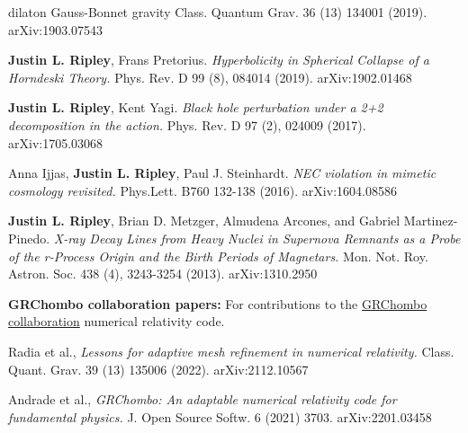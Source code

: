 \documentclass{my_cv}
\begin{document}
\begin{etaremune}
{      dilaton Gauss-Bonnet gravity}
   Class. Quantum Grav. 36 (13) 134001 (2019).
   arXiv:1903.07543
\item {\bf Justin L. Ripley}, Frans Pretorius. 
   \emph{Hyperbolicity in Spherical Collapse of a Horndeski Theory.}
   Phys. Rev. D 99 (8), 084014 (2019).
   arXiv:1902.01468
\item {\bf Justin L. Ripley}, Kent Yagi. 
   \emph{Black hole perturbation under a 2+2 decomposition
      in the action.}
   Phys. Rev. D 97 (2), 024009 (2017).
   arXiv:1705.03068
\item Anna Ijjas, {\bf Justin L. Ripley}, Paul J. Steinhardt.
   \emph{NEC violation in mimetic cosmology revisited.}
   Phys.Lett. B760 132-138 (2016).
   arXiv:1604.08586
\item {\bf Justin L. Ripley}, Brian D. Metzger,	
      Almudena Arcones, and Gabriel Martinez-Pinedo.
   \emph{X-ray Decay Lines from Heavy Nuclei in
      Supernova Remnants as a Probe of the r-Process Origin
      and the Birth Periods of Magnetars.}
   Mon. Not. Roy. Astron. Soc. 438 (4), 3243-3254 (2013).
   arXiv:1310.2950
\end{etaremune}

{\bf GRChombo collaboration papers:} For contributions to the 
\href{https://www.grchombo.org/}{GRChombo collaboration} 
numerical relativity code.
\begin{etaremune}
\item Radia et al., 
   \emph{Lessons for adaptive mesh refinement in numerical relativity.}
    Class. Quant. Grav. 39 (13) 135006 (2022).
    arXiv:2112.10567

\item Andrade et al.,
   \emph{GRChombo: An adaptable numerical relativity code for fundamental physics.}
   J. Open Source Softw. 6 (2021) 3703. 
   arXiv:2201.03458

\end{etaremune}
\end{document}
